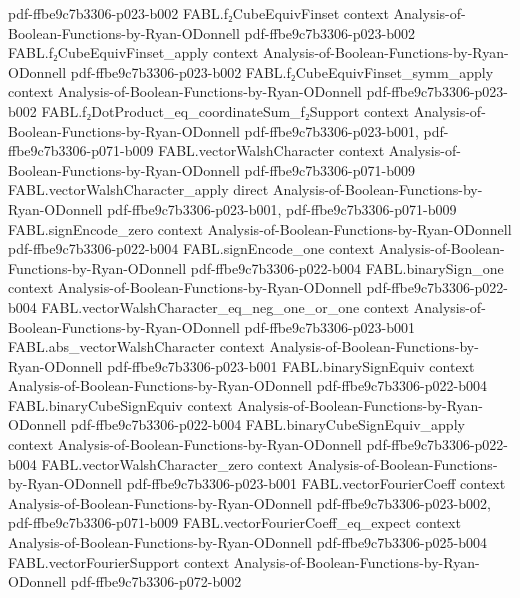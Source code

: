 \begin{theorem}
  {pdf-ffbe9c7b3306-p023-b002}
\proofstep
  {FABL.f₂CubeEquivFinset}
  {context}
  {Analysis-of-Boolean-Functions-by-Ryan-ODonnell}
  {pdf-ffbe9c7b3306-p023-b002}
\proofstep
  {FABL.f₂CubeEquivFinset_apply}
  {context}
  {Analysis-of-Boolean-Functions-by-Ryan-ODonnell}
  {pdf-ffbe9c7b3306-p023-b002}
\proofstep
  {FABL.f₂CubeEquivFinset_symm_apply}
  {context}
  {Analysis-of-Boolean-Functions-by-Ryan-ODonnell}
  {pdf-ffbe9c7b3306-p023-b002}
\proofstep
  {FABL.f₂DotProduct_eq_coordinateSum_f₂Support}
  {context}
  {Analysis-of-Boolean-Functions-by-Ryan-ODonnell}
  {pdf-ffbe9c7b3306-p023-b001,
    pdf-ffbe9c7b3306-p071-b009}
\proofstep
  {FABL.vectorWalshCharacter}
  {context}
  {Analysis-of-Boolean-Functions-by-Ryan-ODonnell}
  {pdf-ffbe9c7b3306-p071-b009}
\proofstep
  {FABL.vectorWalshCharacter_apply}
  {direct}
  {Analysis-of-Boolean-Functions-by-Ryan-ODonnell}
  {pdf-ffbe9c7b3306-p023-b001,
    pdf-ffbe9c7b3306-p071-b009}
\proofstep
  {FABL.signEncode_zero}
  {context}
  {Analysis-of-Boolean-Functions-by-Ryan-ODonnell}
  {pdf-ffbe9c7b3306-p022-b004}
\proofstep
  {FABL.signEncode_one}
  {context}
  {Analysis-of-Boolean-Functions-by-Ryan-ODonnell}
  {pdf-ffbe9c7b3306-p022-b004}
\proofstep
  {FABL.binarySign_one}
  {context}
  {Analysis-of-Boolean-Functions-by-Ryan-ODonnell}
  {pdf-ffbe9c7b3306-p022-b004}
\proofstep
  {FABL.vectorWalshCharacter_eq_neg_one_or_one}
  {context}
  {Analysis-of-Boolean-Functions-by-Ryan-ODonnell}
  {pdf-ffbe9c7b3306-p023-b001}
\proofstep
  {FABL.abs_vectorWalshCharacter}
  {context}
  {Analysis-of-Boolean-Functions-by-Ryan-ODonnell}
  {pdf-ffbe9c7b3306-p023-b001}
\proofstep
  {FABL.binarySignEquiv}
  {context}
  {Analysis-of-Boolean-Functions-by-Ryan-ODonnell}
  {pdf-ffbe9c7b3306-p022-b004}
\proofstep
  {FABL.binaryCubeSignEquiv}
  {context}
  {Analysis-of-Boolean-Functions-by-Ryan-ODonnell}
  {pdf-ffbe9c7b3306-p022-b004}
\proofstep
  {FABL.binaryCubeSignEquiv_apply}
  {context}
  {Analysis-of-Boolean-Functions-by-Ryan-ODonnell}
  {pdf-ffbe9c7b3306-p022-b004}
\proofstep
  {FABL.vectorWalshCharacter_zero}
  {context}
  {Analysis-of-Boolean-Functions-by-Ryan-ODonnell}
  {pdf-ffbe9c7b3306-p023-b001}
\proofstep
  {FABL.vectorFourierCoeff}
  {context}
  {Analysis-of-Boolean-Functions-by-Ryan-ODonnell}
  {pdf-ffbe9c7b3306-p023-b002,
    pdf-ffbe9c7b3306-p071-b009}
\proofstep
  {FABL.vectorFourierCoeff_eq_expect}
  {context}
  {Analysis-of-Boolean-Functions-by-Ryan-ODonnell}
  {pdf-ffbe9c7b3306-p025-b004}
\proofstep
  {FABL.vectorFourierSupport}
  {context}
  {Analysis-of-Boolean-Functions-by-Ryan-ODonnell}
  {pdf-ffbe9c7b3306-p072-b002}

\end{theorem}
